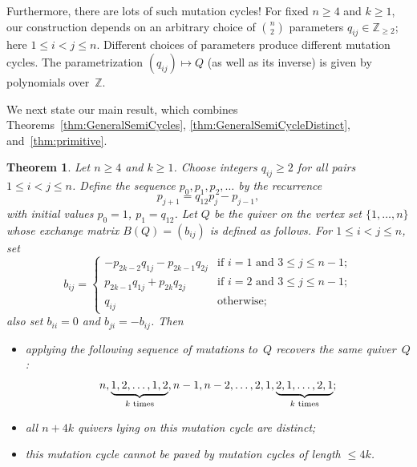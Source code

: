 \documentclass[11pt, letterpaper]{amsart}
\newtheorem{theorem}{Theorem}[section]
\theoremstyle{definition}
\numberwithin{equation}{section}
\def\ZZ{{\mathbb Z}}
\begin{document}
Furthermore, there are lots of such mutation cycles! 
For fixed $n\ge 4$ and $k\ge 1$, our construction depends on an arbitrary choice of 
$\binom{n}{2}$ parameters $q_{ij}\in \ZZ_{\ge2}$; here $1\le i<j\le n$.
Different choices of parameters produce different mutation cycles. 
The parametrization $(q_{ij})\mapsto Q$
(as well as its inverse) is given by polynomials over~$\ZZ$. 

\medskip

We next state our main result, which combines 
Theorems~\ref{thm:GeneralSemiCycles}, \ref{thm:GeneralSemiCycleDistinct}, and~\ref{thm:primitive}. 

\begin{theorem}%
\label{thm:Summary}
Let $n\ge 4$ and $k\ge 1$. 
Choose integers $q_{ij} \geq 2$ for all pairs $1 \leq i < j \leq n$. 
Define the sequence $p_0,p_1,p_2,\dots$ by the recurrence 
\begin{equation}
p_{j+1}=q_{12} p_j -p_{j-1}, 
\end{equation}
with initial values $p_0=1$, $p_1=q_{12}$. 
Let $Q$ be the quiver on the vertex set $\{1,\dots,n\}$ whose exchange matrix $B(Q)=(b_{ij})$ is defined as follows. 
For $1\le i<j\le n$, set 
\[
b_{ij} = 
\begin{cases}
-p_{2k-2} q_{1j} - p_{2k-1} q_{2j} & \text{if $i=1$ and $3\le j \le n-1$}; \\ 
p_{2k-1} q_{1j} + p_{2k} q_{2j} & \text{if $i=2$ and $3\le j \le n-1$}; \\
q_{ij} & \text{otherwise}; 
\end{cases}
\]
also set $b_{ii}=0$ and $b_{ji}=-b_{ij}$. 
Then 
\begin{itemize}[leftmargin=.2in]
\item 
applying the following sequence of mutations to~$Q$ recovers the same quiver~$Q$: 
\begin{equation}
\label{eq:main-cycle}
n, \underbrace{1,2,\dots ,1,2}_{\textup{$k$ times}}, n-1, n-2, \dots, 2, 1, \underbrace{2,1,\dots ,2,1}_{\textup{$k$ times}}; 
\end{equation}
\item
all $n+4k$ quivers lying on this mutation cycle are distinct; 
\item
this mutation cycle cannot be paved by mutation cycles of length $\le 4k$. 
\end{itemize}
\end{theorem}
\end{document}
